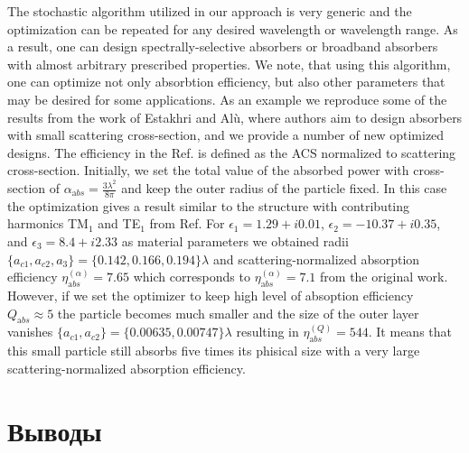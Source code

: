 The stochastic algorithm utilized in our approach is very generic and
the optimization can be repeated for any desired wavelength or
wavelength range.  As a result, one can design spectrally-selective
absorbers or broadband absorbers with almost arbitrary prescribed
properties. We note, that using this algorithm, one can optimize not
only absorbtion efficiency, but also other parameters that may be
desired for some applications. As an example we reproduce some of the
results from the work of Estakhri and Al\`u,\cite{Alu-2014} where
authors aim to design absorbers with small scattering cross-section,
and we provide a number of new optimized designs. The efficiency in
the Ref.\cite{Alu-2014} is defined as the ACS normalized to
scattering cross-section. Initially, we set the total value of the
absorbed power with cross-section of $\alpha_{\mathrm
  abs}=\frac{3\lambda^2}{8\pi}$ and keep the outer radius of the
particle fixed. In this case the optimization gives a result similar
to the structure with contributing harmonics TM${_1}$ and TE$_1$ from
Ref.\cite{Alu-2014}  For $\epsilon_1 = 1.29+i0.01$, $\epsilon_2 =
-10.37+ i0.35$, and $\epsilon_3=8.4+i2.33$ as material parameters we
obtained radii $\{a_{c1},a_{c2},a_3\}=\{0.142,0.166,0.194\}\lambda$
and scattering-normalized absorption efficiency $\eta_{\mathrm
  abs}^{(\alpha)} =7.65$ which corresponds to $\eta_{\mathrm
  abs}^{(\alpha)} =7.1$ from the original work.\cite{Alu-2014}
However, if we set the optimizer to keep high level of absoption
efficiency $Q_{\mathrm abs} \approx 5$ the particle becomes much smaller
and the size of the outer layer vanishes
$\{a_{c1},a_{c2}\}=\{0.00635,0.00747\}\lambda$ resulting in $\eta_{\mathrm
  abs}^{(Q)} =544$.  It means that this small particle still absorbs
five times its phisical size with a very large scattering-normalized
absorption efficiency.


\section{Выводы}



\clearpage